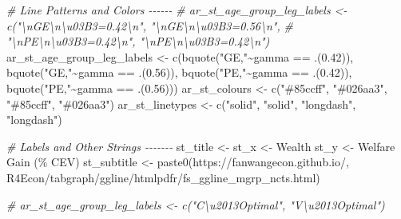 \documentclass[
]{book}
\newenvironment{Shaded}{\begin{snugshade}}{\end{snugshade}}
\newcommand{\CommentTok}[1]{\textcolor[rgb]{0.56,0.35,0.01}{\textit{#1}}}
\newcommand{\FloatTok}[1]{\textcolor[rgb]{0.00,0.00,0.81}{#1}}
\newcommand{\FunctionTok}[1]{\textcolor[rgb]{0.00,0.00,0.00}{#1}}
\newcommand{\NormalTok}[1]{#1}
\newcommand{\OtherTok}[1]{\textcolor[rgb]{0.56,0.35,0.01}{#1}}
\newcommand{\SpecialCharTok}[1]{\textcolor[rgb]{0.00,0.00,0.00}{#1}}
\newcommand{\StringTok}[1]{\textcolor[rgb]{0.31,0.60,0.02}{#1}}
\begin{document}
\begin{Shaded}
\begin{Highlighting}[]
\CommentTok{\# Line Patterns and Colors {-}{-}{-}{-}{-}{-}}
\CommentTok{\# ar\_st\_age\_group\_leg\_labels \textless{}{-} c("\textbackslash{}nGE\textbackslash{}n\textbackslash{}u03B3=0.42\textbackslash{}n", "\textbackslash{}nGE\textbackslash{}n\textbackslash{}u03B3=0.56\textbackslash{}n",}
\CommentTok{\#                                 "\textbackslash{}nPE\textbackslash{}n\textbackslash{}u03B3=0.42\textbackslash{}n", "\textbackslash{}nPE\textbackslash{}n\textbackslash{}u03B3=0.42\textbackslash{}n")}
\NormalTok{ar\_st\_age\_group\_leg\_labels }\OtherTok{\textless{}{-}} \FunctionTok{c}\NormalTok{(}\FunctionTok{bquote}\NormalTok{(}\StringTok{"GE,"}\SpecialCharTok{\textasciitilde{}}\NormalTok{gamma }\SpecialCharTok{==}\NormalTok{ .(}\FloatTok{0.42}\NormalTok{)),}
                                \FunctionTok{bquote}\NormalTok{(}\StringTok{"GE,"}\SpecialCharTok{\textasciitilde{}}\NormalTok{gamma }\SpecialCharTok{==}\NormalTok{ .(}\FloatTok{0.56}\NormalTok{)),}
                                \FunctionTok{bquote}\NormalTok{(}\StringTok{"PE,"}\SpecialCharTok{\textasciitilde{}}\NormalTok{gamma }\SpecialCharTok{==}\NormalTok{ .(}\FloatTok{0.42}\NormalTok{)),}
                                \FunctionTok{bquote}\NormalTok{(}\StringTok{"PE,"}\SpecialCharTok{\textasciitilde{}}\NormalTok{gamma }\SpecialCharTok{==}\NormalTok{ .(}\FloatTok{0.56}\NormalTok{)))}
\NormalTok{ar\_st\_colours }\OtherTok{\textless{}{-}} \FunctionTok{c}\NormalTok{(}\StringTok{"\#85ccff"}\NormalTok{, }\StringTok{"\#026aa3"}\NormalTok{, }\StringTok{"\#85ccff"}\NormalTok{, }\StringTok{"\#026aa3"}\NormalTok{)}
\NormalTok{ar\_st\_linetypes }\OtherTok{\textless{}{-}} \FunctionTok{c}\NormalTok{(}\StringTok{"solid"}\NormalTok{, }\StringTok{"solid"}\NormalTok{, }\StringTok{"longdash"}\NormalTok{, }\StringTok{"longdash"}\NormalTok{)}

\CommentTok{\# Labels and Other Strings {-}{-}{-}{-}{-}{-}{-}}
\NormalTok{st\_title }\OtherTok{\textless{}{-}} \StringTok{\textquotesingle{}\textquotesingle{}}
\NormalTok{st\_x }\OtherTok{\textless{}{-}} \StringTok{\textquotesingle{}Wealth\textquotesingle{}}
\NormalTok{st\_y }\OtherTok{\textless{}{-}} \StringTok{\textquotesingle{}Welfare Gain (\% CEV)\textquotesingle{}}
\NormalTok{st\_subtitle }\OtherTok{\textless{}{-}} \FunctionTok{paste0}\NormalTok{(}\StringTok{\textquotesingle{}https://fanwangecon.github.io/\textquotesingle{}}\NormalTok{,}
                      \StringTok{\textquotesingle{}R4Econ/tabgraph/ggline/htmlpdfr/fs\_ggline\_mgrp\_ncts.html\textquotesingle{}}\NormalTok{)}

\CommentTok{\# ar\_st\_age\_group\_leg\_labels \textless{}{-} c("C\textbackslash{}u2013Optimal", "V\textbackslash{}u2013Optimal")}


\end{Highlighting}
\end{Shaded}
\end{document}
